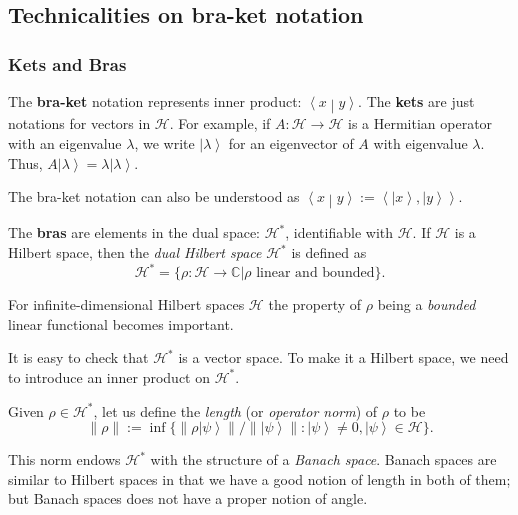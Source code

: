 


\subsection{Technicalities on bra-ket notation}

\subsubsection{Kets and Bras}



The \textbf{bra-ket} notation represents inner product: $\left\langle x \middle| y \right\rangle $. The  \textbf{kets} are just notations for vectors in $\mathscr{H}$.
For example, if $A: \mathscr{H} \to  \mathscr{H}$ is a Hermitian operator with an eigenvalue $\lambda$, we write $\left| \lambda \right\rangle $ for an eigenvector of $A$ with eigenvalue $\lambda$. Thus,  $A \left| \lambda \right\rangle  = \lambda \left| \lambda \right\rangle $.

The bra-ket notation can also be understood as $\left\langle x \middle| y \right\rangle := \left\langle \left| x \right\rangle , \left| y \right\rangle  \right\rangle $.

The \textbf{bras} are elements in the dual space: $\mathscr{H}^*$, identifiable with $\mathscr{H}$. If $\mathscr{H}$ is a Hilbert space, then the \textit{dual Hilbert space} $\mathscr{H}^*$ is defined as
\[
	\mathscr{H}^* = \{\rho: \mathscr{H} \to  \mathbb{C} | \rho \text{ linear and bounded}\} 
.\] 
\begin{remark}
	For infinite-dimensional Hilbert spaces $\mathscr{H}$ the property of $\rho$ being a \textit{bounded} linear functional becomes important.
\end{remark}

It is easy to check that $\mathscr{H}^*$ is a vector space. To make it a Hilbert space, we need to introduce an inner product on $\mathscr{H}^*$. 

Given $\rho \in \mathscr{H}^*$, let us define the \textit{length} (or \textit{operator norm}) of $\rho$ to be
\[
	\|\rho\| := \inf \{\|\rho \left| \psi \right\rangle \| / \|\left| \psi \right\rangle \|: \left| \psi \right\rangle \neq 0, \left| \psi  \right\rangle \in \mathscr{H}\} 
.\] 
\begin{remark}
	This norm endows $\mathscr{H}^*$ with the structure of a \textit{Banach space}. Banach spaces are similar to Hilbert spaces in that we have a good notion of length in both of them; but Banach spaces does not have a proper notion of angle.
\end{remark}


